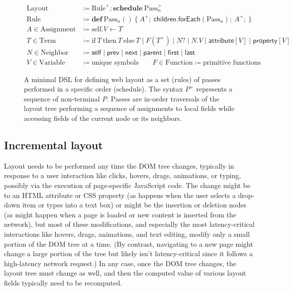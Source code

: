 \begin{figure}

\begin{align*}
\text{Layout} &\coloneq  \text{Rule}^+; \textbf{schedule}\:\text{Pass}_n^+ \\
\text{Rule} &\coloneq
  \mathbf{def}\:\text{Pass}_n()\:\{\:
    A^+;\:
    \mathsf{children}.\mathsf{forEach}(\text{Pass}_n);\:
    A^+;\:
  \} \\
A \in \text{Assignment} &\coloneq
  \text{self}.V \leftarrow T \\[4pt]
T \in \text{Term} &\coloneq
  \text{if}\ T\ \text{then}\ T\ \text{else}\ T \mid
  F(T^+) \mid
  N? \mid
  N.V \mid
  \mathsf{attribute}[V] \mid
  \mathsf{property}[V] \\
N \in \text{Neighbor} &\coloneq
  \mathsf{self} \mid \mathsf{prev} \mid
  \mathsf{next} \mid \mathsf{parent} \mid
  \mathsf{first} \mid \mathsf{last} \\[4pt]
V \in \text{Variable} &\coloneq \text{unique symbols} \quad\quad
F \in \text{Function} \coloneq \text{primitive functions}
\end{align*}
\caption{
  A minimal DSL for defining web layout
    as a set (\textsf{rules}) of passes
    performed in a specific order (\textsf{schedule}).
  The syntax $P^+$ represents a sequence of non-terminal $P$.
  Passes are in-order traversals of the layout tree
    performing a sequence of assignments to local fields
    while accessing fields of the current node or its neighbors.
}
\label{fig:dsl}
\end{figure}


\subsection{Incremental layout}

Layout needs to be performed any time the DOM tree changes,
  typically in response to a user interaction like
  clicks, hovers, drags, animations, or typing,
  possibly via the execution of page-specific JavaScript code.
The change might be to an HTML attribute or CSS property
  (as happens when the user selects a drop-down item
  or types into a text box)
  or might be the insertion or deletion nodes
  (as might happen when a page is loaded or new content
  is inserted from the network),
  but most of these modifications,
  and especially the most latency-critical
  interactions like hovers, drags, animations, and text editing,
  modify only a small portion of the DOM tree at a time.
(By contrast, navigating to a new page
  might change a large portion of the tree
  but likely isn't latency-critical since it follows
  a high-latency network request.)
In any case, once the DOM tree changes,
  the layout tree must change as well,
  and then the computed value of various layout fields
  typically need to be recomputed.

